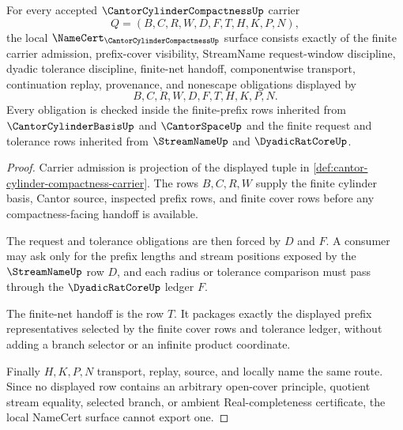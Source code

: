 \begin{theorem}
\label{thm:cantor-cylinder-compactness-namecert-obligations}
For every accepted $\CantorCylinderCompactnessUp$ carrier
$$
Q=(B,C,R,W,D,F,T,H,K,P,N),
$$
the local $\NameCert_{\CantorCylinderCompactnessUp}$ surface consists exactly of the finite carrier admission, prefix-cover visibility, StreamName request-window discipline, dyadic tolerance discipline, finite-net handoff, componentwise transport, continuation replay, provenance, and nonescape obligations displayed by
$$
B,C,R,W,D,F,T,H,K,P,N .
$$
Every obligation is checked inside the finite-prefix rows inherited from $\CantorCylinderBasisUp$ and $\CantorSpaceUp$ and the finite request and tolerance rows inherited from $\StreamNameUp$ and $\DyadicRatCoreUp$.
\end{theorem}
\begin{proof}
Carrier admission is projection of the displayed tuple in \autoref{def:cantor-cylinder-compactness-carrier}. The rows $B,C,R,W$ supply the finite cylinder basis, Cantor source, inspected prefix rows, and finite cover rows before any compactness-facing handoff is available.

The request and tolerance obligations are then forced by $D$ and $F$. A consumer may ask only for the prefix lengths and stream positions exposed by the $\StreamNameUp$ row $D$, and each radius or tolerance comparison must pass through the $\DyadicRatCoreUp$ ledger $F$.

The finite-net handoff is the row $T$. It packages exactly the displayed prefix representatives selected by the finite cover rows and tolerance ledger, without adding a branch selector or an infinite product coordinate.

Finally $H,K,P,N$ transport, replay, source, and locally name the same route. Since no displayed row contains an arbitrary open-cover principle, quotient stream equality, selected branch, or ambient Real-completeness certificate, the local NameCert surface cannot export one.
\end{proof}

